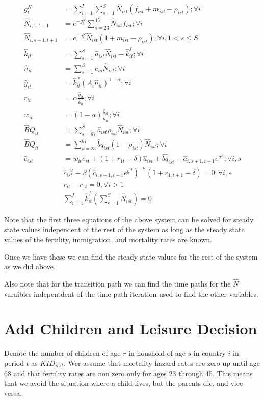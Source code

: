 \documentclass[letterpaper,12pt]{article}
\theoremstyle{definition}
\numberwithin{equation}{section}
\begin{document}
\begin{spacing}{1.5}
	\begin{align}
		g^N_t & = \sum_{i=1}^I \sum_{s=1}^S \hat N_{ist} (f_{ist}+m_{ist}-\rho_{ist}) ; \forall i\\
		\hat N_{i,1,t+1} & = e^{-g^N_t}\sum_{s=23}^{45} \hat N_{ist} f_{ist} ; \forall i\\
		\hat N_{i,s+1,t+1} & = e^{-g^N_t}\hat N_{ist} (1+m_{ist}-\rho_{ist}); \forall i, 1<s\le S \\
		\hat k_{it} & = \sum_{s=1}^S \hat a_{ist} \hat N_{ist} - \hat k_{it}^f; \forall i \\
		\hat n_{it} & = \sum_{s=1}^S e_{is} \hat N_{ist}; \forall i \\
		\hat y_{it} & = \hat k_{it}^\alpha \left( A_{i} \hat n_{it} \right)^{1-\alpha} ; \forall i \\
		r_{it} & = \alpha \frac{\hat y_{it}}{\hat k_{it}}; \forall i \\
		w_{it} & = (1-\alpha) \frac{\hat y_{it}}{\hat n_{it}}; \forall i \\
		\hat BQ_{it} & = \sum_{s=67}^S \hat a_{ist} \rho_{ist} \hat N_{ist} ; \forall i \\
		\hat BQ_{it} & = \sum_{s=23}^{67} \hat bq_{ist} (1-\rho_{ist}) \hat N_{ist}	; \forall i \\
    	\hat c_{ist} & = w_{it} e_{st} + (1+r_{1t}-\delta)\hat a_{ist} + \hat{bq}_{ist} - \hat a_{i,s+1,t+1}e^{g^A} ; \forall i,s \\
		& \hat c_{ist}^{-\sigma} - \beta \left(\hat c_{i,s+1,t+1} e^{g^A}\right)^{-\sigma}(1+r_{1,t+1}-\delta) = 0; \forall i,s \\ 
		& r_{it} - r_{1t} = 0; \forall i>1 \\
		& \sum_{i=1}^I \hat k^f_{it} \left( \sum_{s=1}^S \hat N_{ist} \right) = 0
	\end{align}

	Note that the first three equations of the above system can be solved for steady state values independent of the rest of the system as long as the steady state values of the fertility, immigration, and mortality rates are known.

	Once we have these we can find the steady state values for the rest of the system as we did above.

	Also note that for the transition path we can find the time paths for the $\hat N$ varaibles indepentdent of the time-path iteration used to find the other variables.


\section{Add Children and Leisure Decision}
	Denote the number of children of age $r$ in houshold of age $s$ in country $i$ in period $t$ as $KID_{irst}$.  Wer assume that mortality hazard rates are zero up until age 68 and that fertility rates are non zero only for ages 23 through 45.  This means that we avoid the situation where a child lives, but the parents die, and vice versa.


\end{spacing}
\end{document}
